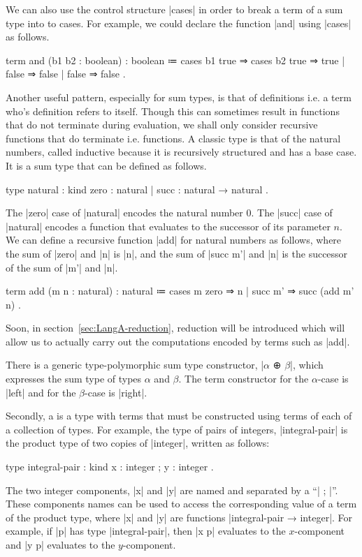 We can also use the control structure \code|cases| in order to break a term of a sum type into to cases.
For example, we could declare the function \code|and| using \code|cases| as follows.
%
\begin{snippet}
term and (b1 b2 : boolean) : boolean
  ≔ cases b1
      { true  ⇒ cases b2
                  { true  ⇒ true
                  | false ⇒ false }
      | false ⇒ false }.
\end{snippet}
%
Another useful pattern, especially for sum types, is that of  definitions i.e. a term who's definition refers to itself.
Though this can sometimes result in functions that do not terminate during evaluation, we shall only consider recursive functions that do terminate i.e.  functions.
A classic  type is that of the natural numbers, called inductive because it is recursively structured and has a base case.
It is a sum type that can be defined as follows.
%
\begin{snippet}
type natural : kind
  { zero : natural
  | succ : natural → natural }.
\end{snippet}
%
The \code|zero| case of \code|natural| encodes the natural number $0$.
The \code|succ| case of \code|natural| encodes a function that evaluates to the successor of its parameter $n$.
We can define a recursive function \code|add| for natural numbers as follows, where the sum of \code|zero| and \code|n| is \code|n|, and the sum of \code|succ m'| and \code|n| is the successor of the sum of \code|m'| and \code|n|.
%
\begin{snippet}
term add (m n : natural) : natural
  ≔ cases m
      { zero    ⇒ n
      | succ m' ⇒ succ (add m' n) }.
\end{snippet}
%
Soon, in section~\ref{sec:LangA-reduction}, reduction will be introduced which will allow us to actually carry out the computations encoded by terms such as \code|add|.

There is a generic type-polymorphic sum type constructor, \code|$α$ ⊕ $β$|, which expresses the sum type of types $α$ and $β$.
The term constructor for the $α$-case is \code|left| and for the $β$-case is \code|right|.

Secondly, a  is a type with terms that must be constructed using terms of each of a collection of  types.
For example, the type of pairs of integers, \code|integral-pair| is the product type of two copies of \code|integer|, written as follows:
%
\begin{snippet}
type integral-pair : kind
  { x : integer
  ; y : integer }.
\end{snippet}
%
The two integer components, \code|x| and \code|y| are named and separated by a ``\code| ; |''.
These components names can be used to access the corresponding value of a term of the product type, where \code|x| and \code|y| are functions \code|integral-pair → integer|.
For example, if \code|p| has type \code|integral-pair|, then \code|x p| evaluates to the $x$-component and \code|y p| evaluates to the $y$-component.

